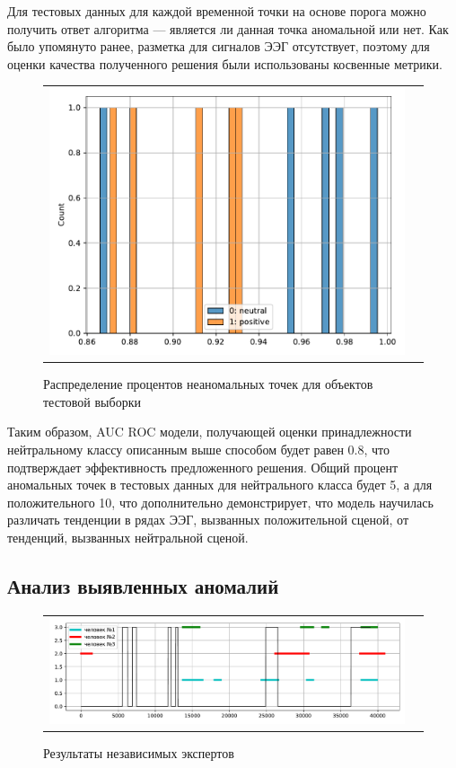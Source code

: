\documentclass{article}
\begin{document}
Для тестовых данных для каждой временной точки на основе порога можно получить ответ алгоритма --- является ли данная точка аномальной или нет. Как было упомянуто ранее, разметка для сигналов ЭЭГ отсутствует, поэтому для оценки качества полученного решения были использованы косвенные метрики.

\begin{figure}[h]
\begin{tabular}{cc}
  \includegraphics[width=160mm]{8.pdf}
\end{tabular}
\caption{Распределение процентов неаномальных точек для объектов тестовой выборки}
\end{figure}

Таким образом, AUC ROC модели, получающей оценки принадлежности нейтральному классу описанным выше способом будет равен 0.8, что подтверждает эффективность предложенного решения. Общий процент аномальных точек в тестовых данных для нейтрального класса будет 5, а для положительного 10, что дополнительно демонстрирует, что модель научилась различать тенденции в рядах ЭЭГ, вызванных положительной сценой, от тенденций, вызванных нейтральной сценой.

\subsection{Анализ выявленных аномалий}
\begin{figure}[h]
\begin{tabular}{cc}
  \includegraphics[width=160mm]{10.pdf}
\end{tabular}
\caption{Результаты независимых экспертов}
\label{fig:experts}
\end{figure}
\end{document}

